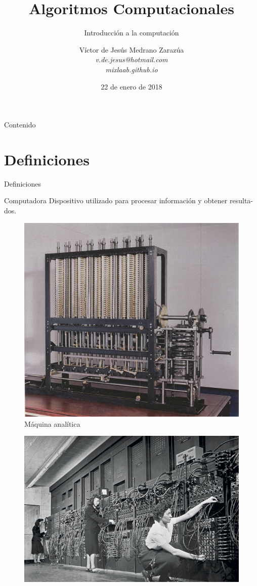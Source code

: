 \documentclass{beamer}
\title[Algoritmos Computacionales]{Algoritmos Computacionales}
\subtitle{Introducción a la computación}
\author{Víctor de Jesús Medrano Zarazúa \\
	\textit{v.de.jesus@hotmail.com}\\
	\textit{mixlaab.github.io}\\}
\institute{Centro de Educación y Formación Académica}
\date{22 de enero de 2018}
\begin{document}
	
\begin{frame}
\titlepage
\end{frame}

\begin{frame}[t]{Contenido}\vspace{4pt}
\tableofcontents
\end{frame}

\section{Definiciones}
\begin{frame}[t]{Definiciones}\vspace{4pt}
\begin{block}{Computadora}
Dispositivo utilizado para procesar información y obtener resulta-
dos.
\end{block}
\begin{multicols}{3}
\begin{figure}
	\centering
	\includegraphics[scale=0.08]{analytical}
	\caption{Máquina analítica}
\end{figure}
\begin{figure}
	\centering
	\includegraphics[scale=0.15]{eniac}

\end{figure}
\end{multicols}
\end{frame}
\end{document}
